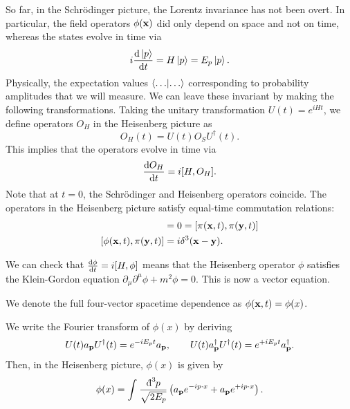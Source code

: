 So far, in the Schrödinger picture, the Lorentz invariance has not been overt. In particular, the field operators $\phi(\vb{x})$ did only depend on space and not on time, whereas the states evolve in time via
\begin{equation}
  i \dv{\ket{p}}{t} = H \ket{p} = E_p \ket{p}.
\end{equation}
Physically, the expectation values $\bra{ \dots } \ket{\dots }$ corresponding to probability amplitudes that we will measure. We can leave these invariant by making the following transformations.
Taking the unitary transformation $U(t) = e^{iHt}$, we define operators $O_H$ in the Heisenberg picture as
\begin{equation}
  O_H(t) = U(t) O_S U^{\dagger}(t).
\end{equation}
This implies that the operators evolve in time via
\begin{equation}
  \dv{O_H}{t} = i [H, O_H].
\end{equation}
Note that at $t = 0$, the Schrödinger and Heisenberg operators coincide.
The operators in the Heisenberg picture satisfy equal-time commutation relations:
\begin{align}
  [\phi(\vb{x}, t), \phi(\vb{y}, t) ] &= 0 = [\pi(\vb{x}, t), \pi(\vb{y}, t)] \\
  [\phi(\vb{x}, t), \pi(\vb{y}, t)] &= i \delta^3(\vb{x} - \vb{y}).
\end{align}
\begin{exercise}
  We can check that $\dv{\phi}{t} = i [H, \phi]$ means that the Heisenberg operator $\phi$ satisfies the Klein-Gordon equation $\partial_\mu \partial^\mu \phi + m^2 \phi = 0$. This is now a vector equation.
\end{exercise}
\begin{notation}[]
  We denote the full four-vector spacetime dependence as $\phi(\vb{x}, t) = \phi(x)$.
\end{notation}
We write the Fourier transform of $\phi(x)$ by deriving
\begin{equation}
  U(t) a_{\vb{p}} U^{\dagger}(t) = e^{-iE_p t} a_{\vb{p}}, \qquad
  U(t) a^{\dagger}_{\vb{p}} U^{\dagger}(t) = e^{+iE_p t} a^{\dagger}_{\vb{p}}.
\end{equation}
Then, in the Heisenberg picture, $\phi(x)$ is given by
\begin{equation}
  \phi(x) = \int_{}^{} \frac{\bdd[3]{p}}{\sqrt{2E_p}} \left( a_{\vb{p}} e^{-ip \cdot x} + a_{\vb{p}} e^{+i p \cdot x} \right).
\end{equation}

